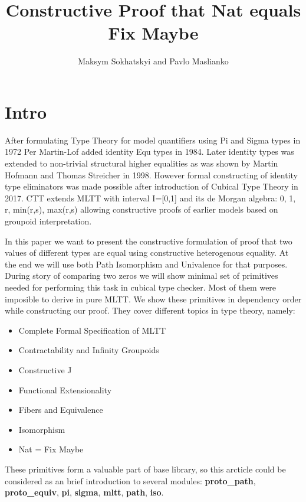 \documentclass{svproc}
\begin{document}
\title{Constructive Proof that Nat equals Fix Maybe}
\author{Maksym Sokhatskyi and Pavlo Maslianko}

\maketitle

\section{Intro}

After formulating Type Theory for model quantifiers using Pi and Sigma types in 1972\cite{Lof72}
Per Martin-Lof added identity Equ types in 1984\cite{Lof84}. Later identity types was extended
to non-trivial structural higher equalities as was shown by Martin Hofmann
and Thomas Streicher in 1998\cite{Hofmann96}. However formal constructing of identity type
eliminators was made possible after introduction of Cubical Type Theory in 2017\cite{Mortberg17}.
CTT extends MLTT with interval I=[0,1] and its de Morgan algebra: 0, 1, r, min(r,s), max(r,s)
allowing constructive proofs of earlier models based on groupoid interpretation.

In this paper we want to present the constructive formulation of proof
that two values of different types are equal using constructive heterogenous equality.
At the end we will use both Path Isomorphism and Univalence for that purposes.
During story of comparing two zeros we will show minimal set of primitives needed
for performing this task in cubical type checker. Most of
them were imposible to derive in pure MLTT. We show these primitives in dependency order
while constructing our proof. They cover different topics in type theory, namely:

\begin{itemize}
\item Complete Formal Specification of MLTT
\item Contractability and Infinity Groupoids
\item Constructive J
\item Functional Extensionality
\item Fibers and Equivalence
\item Isomorphism
\item Nat = Fix Maybe
\end{itemize}

These primitives form a valuable part of
base library, so this arcticle could be considered as an brief introduction
to several modules: {\bf proto\_path}, {\bf proto\_equiv}, {\bf pi},
{\bf sigma}, {\bf mltt}, {\bf path}, {\bf iso}.
\end{document}
